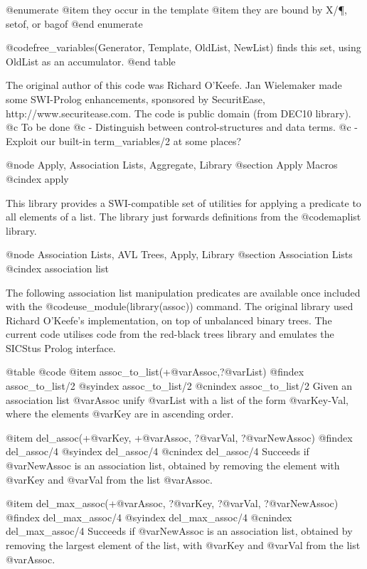 {{{{{{{{{@enumerate
@item they occur in the template
@item they are bound by X/\P, setof, or bagof
@end enumerate

    @code{free_variables(Generator, Template, OldList, NewList)} finds this set, using OldList as an accumulator.
@end table

The original author of this code was Richard O'Keefe. Jan Wielemaker
    made some SWI-Prolog enhancements, sponsored by SecuritEase,
    http://www.securitease.com. The code is public domain (from DEC10 library).
    @c To be done
    @c     - Distinguish between control-structures and data terms.
    @c     - Exploit our built-in term_variables/2 at some places? 



@node Apply, Association Lists, Aggregate, Library
@section Apply Macros
@cindex apply

This library provides a SWI-compatible set of utilities for applying a
predicate to all elements of a list. The library just forwards
definitions from the @code{maplist} library.



@node Association Lists, AVL Trees, Apply, Library
@section Association Lists
@cindex association list

The following association list manipulation predicates are available
once included with the @code{use_module(library(assoc))} command. The
original library used Richard O'Keefe's implementation, on top of
unbalanced binary trees. The current code utilises code from the
red-black trees library and emulates the SICStus Prolog interface.

@table @code
@item assoc_to_list(+@var{Assoc},?@var{List})
@findex assoc_to_list/2
@syindex assoc_to_list/2
@cnindex assoc_to_list/2
Given an association list @var{Assoc} unify @var{List} with a list of
the form @var{Key-Val}, where the elements @var{Key} are in ascending
order.

@item del_assoc(+@var{Key}, +@var{Assoc}, ?@var{Val}, ?@var{NewAssoc})
@findex del_assoc/4
@syindex del_assoc/4
@cnindex del_assoc/4
Succeeds if @var{NewAssoc} is an association list, obtained by removing
the element with @var{Key} and @var{Val} from the list @var{Assoc}.

@item del_max_assoc(+@var{Assoc}, ?@var{Key}, ?@var{Val}, ?@var{NewAssoc})
@findex del_max_assoc/4
@syindex del_max_assoc/4
@cnindex del_max_assoc/4
Succeeds if @var{NewAssoc} is an association list, obtained by removing
the largest element of the list, with @var{Key} and @var{Val} from the
list @var{Assoc}.

}}}}}}}}}
